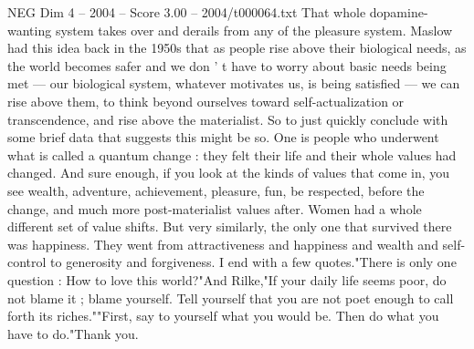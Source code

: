 \begin{textsample}{NEG Dim 4 – 2004 – Score 3.00 – 2004/t000064.txt}
That whole dopamine-wanting system takes over and derails from any of the pleasure system.
Maslow had this idea back in the 1950s that as people rise above their biological needs, as the world becomes safer and we don ' t have to worry about basic needs being met — our biological system, whatever motivates us, is being satisfied — we can rise above them, to think beyond ourselves toward self-actualization or transcendence, and rise above the materialist.
So to just quickly conclude with some brief data that suggests this might be so.
One is people who underwent what is called a quantum change : they felt their life and their whole values had changed.
And sure enough, if you look at the kinds of values that come in, you see wealth, adventure, achievement, pleasure, fun, be respected, before the change, and much more post-materialist values after.
Women had a whole different set of value shifts.
But very similarly, the only one that survived there was happiness.
They went from attractiveness and happiness and wealth and self-control to generosity and forgiveness.
I end with a few quotes."There is only one question : How to love this world?"And Rilke,"If your daily life seems poor, do not blame it ; blame yourself.
Tell yourself that you are not poet enough to call forth its riches.""First, say to yourself what you would be.
Then do what you have to do."Thank you.

\end{textsample}
